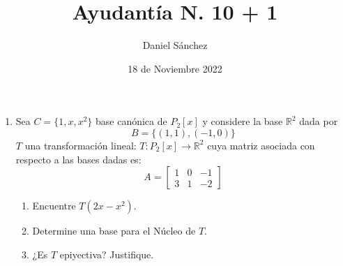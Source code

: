 \documentclass[12pt]{article}
\begin{document}
\title{Ayudant\'ia N. 10 + 1}
\date{18 de Noviembre 2022}
\author{Daniel S\'anchez}
\maketitle

\begin{enumerate}
      \item Sea $C = \{1,x,x^2\}$ base can\'onica de $P_2[x]$
            y considere la base $\mathbb{R}^2$ dada por $$B = \{(1,1),(-1,0)\}$$ $T$ una transformaci\'on lineal:
            $T : P_2[x] \rightarrow \mathbb{R}^2$ cuya matriz asociada con respecto a las bases dadas es:
            $$A = \begin{bmatrix}
                        1 & 0 & -1 \\
                        3 & 1 & -2
                  \end{bmatrix}$$
            \begin{enumerate}
                  \item Encuentre $T(2x-x^2)$.
                  \item Determine una base para el N\'ucleo de $T$.
                  \item ¿Es $T$ epiyectiva? Justifique.
            \end{enumerate}


\end{enumerate}
\end{document}
